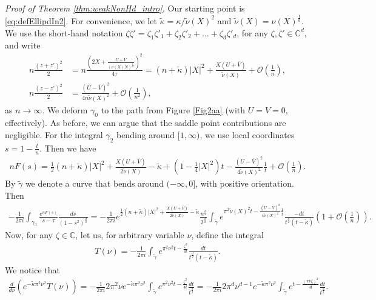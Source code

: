 \documentclass[%
 jmp,
cp,  %
 amsmath,amsthm,amssymb,%
 reprint,%
onecolumn]{revtex4-2}
\begin{document}
\noindent \textit{Proof of Theorem \ref{thm:weakNonHd_intro}.}
Our starting point is \eqref{eq:defEllipdIn2}. For convenience, we let $\tilde\kappa = \kappa/\tilde{\nu}(X)^2$ and $\tilde \nu(X) = \nu(X)^\frac{1}{d}$. We use the short-hand notation $\zeta \zeta'=\zeta_1\zeta'_1+\zeta_2 \zeta'_2 + \ldots + \zeta_d \zeta'_d$, for any $\zeta, \zeta'\in \mathbb C^d$, and write
\begin{align*}
n \frac{(z+z')^2}{2} &= n \frac{\left(2 X + \frac{U+\overline V}{(\nu(X) N)^\frac{1}{d}}\right)^2}{4\tau} 
= (n+\tilde\kappa) \lvert X\rvert^2 + \frac{X(U+\overline V)}{\tilde\nu(X)} + \mathcal O\left(\frac{1}{n}\right),\\
n \frac{(z-z')^2}{2} &= \frac{(U-\overline V)^2}{4 n \tilde\nu(X)^2}+ \mathcal O\left(\frac{1}{n^2}\right) ,
\end{align*}
as $n\to\infty$. We deform $\gamma_0$ to the path from Figure \ref{Fig2aa} (with $U=V=0$, effectively). As before, we can argue that the saddle point contributions are negligible. For the integral $\gamma_2$ bending around $[1,\infty)$, we use local coordinates $s = 1 - \frac{t}{n}$. Then we have
\begin{align*}
n F(s) = \frac{1}{2} (n+\tilde\kappa) \lvert X\rvert^2 + \frac{X(U+\overline V)}{2 \tilde\nu(X)} - \tilde\kappa
+(1- \frac{1}{4} \lvert X\rvert^2) t - \frac{(U-\overline V)^2}{4 \tilde\nu(X)^2} \frac{1}{t} + \mathcal O\left(\frac{1}{n}\right).
\end{align*}
By $\tilde\gamma$ we denote a curve that bends around $(-\infty, 0]$, with positive orientation. Then
\begin{align} \label{eq:defTnu3}
-\frac{1}{2\pi i} \int_{\gamma_3} \frac{e^{n F(s)}}{s-\tau} \frac{ds}{(1-s^2)^\frac{d}{2}}
= -\frac{1}{2\pi i} e^{\frac{1}{2} (n+\tilde\kappa) \lvert X\rvert^2 + \frac{X(U+\overline V)}{2 \tilde\nu(X)}-\tilde\kappa} \frac{n^\frac{d}{2}}{2^\frac{d}{2}} \int_{\tilde\gamma} e^{\pi^2 \tilde\nu(X)^2 t - \frac{(U-\overline V)^2}{4 \tilde\nu(X)^2} \frac{1}{t}} 
\frac{-dt}{t^\frac{d}{2} (t-\tilde\kappa)} \left(1+\mathcal O\left(\frac{1}{n}\right)\right).
\end{align}
Now, for any $\zeta\in\mathbb C$, let us, for arbitrary variable $\nu$, define the integral
\begin{align} \label{eq:defTnu}
T(\nu) = -\frac{1}{2\pi i} \int_{\tilde\gamma} e^{\pi^2 \nu^2 t - \frac{\zeta^2}{4 t}} \frac{dt}{t^\frac{d}{2} (t-\tilde\kappa)}. 
\end{align}
We notice that
\begin{align*}
\frac{d}{d\nu} \left(e^{-\tilde\kappa\pi^2 \nu^2} T(\nu)\right)
= -\frac{1}{2\pi i} 2\pi^2 \nu e^{-\tilde\kappa \pi^2 \nu^2} \int_{\tilde\gamma} e^{\pi^2 \nu^2 t - \frac{\zeta^2}{4 t}} \frac{dt}{t^\frac{d}{2}}
= -\frac{1}{2\pi i} 2 \pi^d \nu^{d-1} e^{-\tilde\kappa \pi^2 \nu^2} \int_{\tilde\gamma} e^{t - \frac{(\pi \nu \zeta)^2}{4 t}} \frac{dt}{t^\frac{d}{2}}.
\end{align*}
\end{document}
